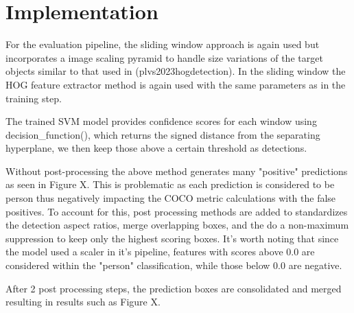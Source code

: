 \section{Implementation}


For the evaluation pipeline, the sliding window approach is again used but incorporates a image scaling pyramid to handle size variations of the target objects similar to that used in (plvs2023hogdetection).
In the sliding window the HOG feature extractor method is again used with the same parameters as in the training step.

The  trained SVM model provides confidence scores for each window using decision_function(), which returns the signed distance from the separating hyperplane, we then keep those above a certain threshold as detections.

Without post-processing the above method generates many "positive" predictions as seen in Figure X. 
This is problematic as each prediction is considered to be person thus negatively impacting the COCO metric calculations with the false positives. 
To account for this, post processing methods are added to standardizes the detection aspect ratios, merge overlapping boxes, and the do a non-maximum suppression to keep only the highest scoring boxes.
It's worth noting that since the model used a scaler in it's pipeline, features with scores above 0.0 are considered within the "person" classification, while those below  0.0 are negative.

After 2 post processing steps, the prediction boxes are consolidated and merged resulting in results such as Figure X.